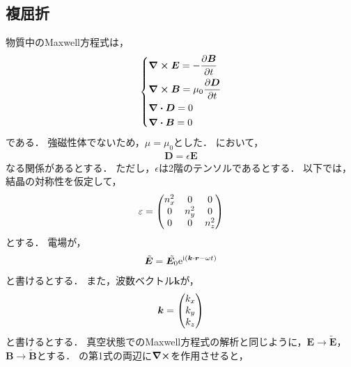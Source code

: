 \documentclass{report}
\begin{document}
  \subsection{複屈折}
    物質中のMaxwell方程式は，
    \begin{align}
      \begin{dcases}
        \curl \bm{E} = -\pdv{\bm{B}}{t} \\ 
        \curl \bm{B} = \mu_0\pdv{\bm{D}}{t} \\ 
        \div \bm{D} = 0 \\ \label{maxwell-material}
        \div \bm{B} = 0
      \end{dcases}
    \end{align}
    である．
    強磁性体でないため，$\mu = \mu_0$とした．
    において，
    \begin{align}
      \bm{D} = \epsilon\bm{E}
    \end{align}
    なる関係があるとする．
    ただし，$\epsilon$は2階のテンソルであるとする．
    以下では，結晶の対称性を仮定して，
    \begin{align}
      \epsilon = \mqty(\dmat[0]{n^2_x, n^2_y, n^2_z})
    \end{align}
    とする．
    電場が，
    \begin{align}
      \tilde{\bm{E}} = \tilde{\bm{E}_0}\mathrm{e}^{\mathrm{i}(\bm{k}\cdot \bm{r} - \omega t)} 
    \end{align}
    と書けるとする．
    また，波数ベクトル$\bm{k}$が，
    \begin{align}
      \bm{k} = \mqty(k_x \\ k_y \\ k_z)
    \end{align}
    と書けるとする．
    真空状態でのMaxwell方程式の解析と同じように，$\bm{E} \to \tilde{\bm{E}}$，$\bm{B} \to \tilde{\bm{B}}$とする．
    の第1式の両辺に$\curl$を作用させると，
\end{document}

